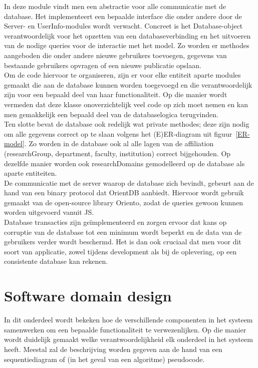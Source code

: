 \documentclass{article}
\begin{document}
In deze module vindt men een abstractie voor alle communicatie met de database. Het implementeert een bepaalde interface die onder andere door de Server- en UserInfo-modules wordt verwacht. Concreet is het Database-object verantwoordelijk voor het opzetten van een databaseverbinding en het uitvoeren van de nodige queries voor de interactie met het model. Zo worden er methodes aangeboden die onder andere nieuwe gebruikers toevoegen, gegevens van bestaande gebruikers opvragen of een nieuwe publicatie opslaan.\\

Om de code hiervoor te organiseren, zijn er voor elke entiteit aparte modules gemaakt die aan de database kunnen worden toegevoegd en die verantwoordelijk zijn voor een bepaald deel van haar functionaliteit. Op die manier wordt vermeden dat deze klasse onoverzichtelijk veel code op zich moet nemen en kan men gemakkelijk een bepaald deel van de databaselogica terugvinden. \\

Ten slotte bevat de database ook redelijk wat private methodes; deze zijn nodig om alle gegevens correct op te slaan volgens het (E)ER-diagram uit figuur~\ref{ER-model}. Zo worden in de database ook al alle lagen van de affiliation (researchGroup, department, faculty, institution) correct bijgehouden. Op dezelfde manier worden ook researchDomains gemodelleerd op de database als aparte entiteiten.\\

De communicatie met de server waarop de database zich bevindt, gebeurt aan de hand van een binary protocol dat OrientDB aanbiedt. Hiervoor wordt gebruik gemaakt van de open-source library Oriento, zodat de queries gewoon kunnen worden uitgevoerd vanuit JS. \\

Database transacties zijn ge\"implementeerd en zorgen ervoor dat kans op corruptie van de database tot een minimum wordt beperkt en de data van de gebruikers verder wordt beschermd. Het is dan ook cruciaal dat men voor dit soort van applicatie, zowel tijdens development als bij de oplevering, op een consistente database kan rekenen.

\clearpage

\section{Software domain design}

In dit onderdeel wordt bekeken hoe de verschillende componenten in het systeem samenwerken om een bepaalde functionaliteit te verwezenlijken. Op die manier wordt duidelijk gemaakt welke verantwoordelijkheid elk onderdeel in het systeem heeft.
Meestal zal de beschrijving worden gegeven aan de hand van een sequentiediagram of (in het geval van een algoritme) pseudocode.
\end{document}

